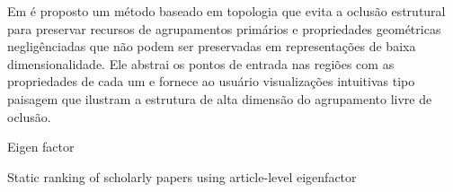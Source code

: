  Em \cite{oesterling2014topology} é proposto um método baseado em topologia que evita a oclusão estrutural para preservar recursos de agrupamentos primários e propriedades geométricas negligênciadas que não podem ser preservadas em representações de baixa dimensionalidade. Ele abstrai os pontos de entrada nas regiões com as propriedades de cada um e fornece ao usuário visualizações intuitivas tipo paisagem que ilustram a estrutura de alta dimensão do agrupamento livre de oclusão.
 


\cite{bergstromeigenfactor}Eigen factor 

\cite{wesley2015static} Static ranking of scholarly papers using article-level eigenfactor

